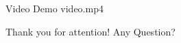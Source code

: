 \documentclass[compress]{beamer}
\begin{document}
\begin{frame}{Video Demo}
%
{video.mp4} %

\end{frame}
\begin{frame}[plain]{Thank you for attention! Any Question?}
\end{frame}
\end{document}
